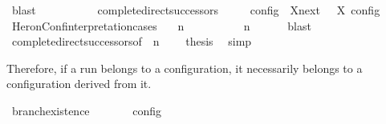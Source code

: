\begin{isabellebody}
\ blast\isanewline
\ \ \ \ \ \ \isamarkupfalse%
\isanewline
\ \ \isamarkupfalse%
%
\endisatagproof
{\isafoldproof}%
%
\isadelimproof
\isanewline
%
\endisadelimproof
\isanewline
{}\isamarkupfalse%
\ complete{\isacharunderscore}direct{\isacharunderscore}successors{\isacharprime}{\isacharcolon}\isanewline
\ \ \ {\isacartoucheopen}{\isasymlbrakk}\ {\isasymS}\ {\isasymrbrakk}\isactrlsub c\isactrlsub o\isactrlsub n\isactrlsub f\isactrlsub i\isactrlsub g\ {\isasymsubseteq}\ {\isacharparenleft}{\isasymUnion}X{\isasymin}{\isasymC}\isactrlsub n\isactrlsub e\isactrlsub x\isactrlsub t\ {\isasymS}{\isachardot}\ {\isasymlbrakk}\ X\ {\isasymrbrakk}\isactrlsub c\isactrlsub o\isactrlsub n\isactrlsub f\isactrlsub i\isactrlsub g{\isacharparenright}{\isacartoucheclose}\isanewline
%
\isadelimproof
%
\endisadelimproof
%
\isatagproof
{}\isamarkupfalse%
\ {\isacharminus}\isanewline
\ \ \isamarkupfalse%
\ HeronConf{\isacharunderscore}interpretation{\isachardot}cases\ \isamarkupfalse%
\ {\isasymGamma}\ n\ {\isasymPsi}\ {\isasymPhi}\isanewline
\ \ \ \ \ {\isacartoucheopen}{\isasymS}\ {\isacharequal}\ {\isacharparenleft}{\isasymGamma}{\isacharcomma}\ n\ {\isasymturnstile}\ {\isasymPsi}\ {\isasymtriangleright}\ {\isasymPhi}{\isacharparenright}{\isacartoucheclose}\ \isamarkupfalse%
\ blast\isanewline
\ \ \isamarkupfalse%
\ complete{\isacharunderscore}direct{\isacharunderscore}successors{\isacharbrackleft}of\ {\isacartoucheopen}{\isasymGamma}{\isacartoucheclose}\ {\isacartoucheopen}n{\isacartoucheclose}\ {\isacartoucheopen}{\isasymPsi}{\isacartoucheclose}\ {\isacartoucheopen}{\isasymPhi}{\isacartoucheclose}{\isacharbrackright}\ \isamarkupfalse%
\ {\isacharquery}thesis\ \isamarkupfalse%
\ simp\isanewline
{}\isamarkupfalse%
%
\endisatagproof
{\isafoldproof}%
%
\isadelimproof
%
\endisadelimproof
%
\begin{isamarkuptext}%
Therefore, if a run belongs to a configuration, it necessarily belongs to a
  configuration derived from it.%
\end{isamarkuptext}\isamarkuptrue%
\isamarkupfalse%
\ branch{\isacharunderscore}existence{\isacharcolon}\isanewline
\ \ \ {\isacartoucheopen}{\isasymrho}\ {\isasymin}\ {\isasymlbrakk}\ {\isasymS}\ {\isasymrbrakk}\isactrlsub c\isactrlsub o\isactrlsub n\isactrlsub f\isactrlsub i\isactrlsub g{\isacartoucheclose}\isanewline

\end{isabellebody}

